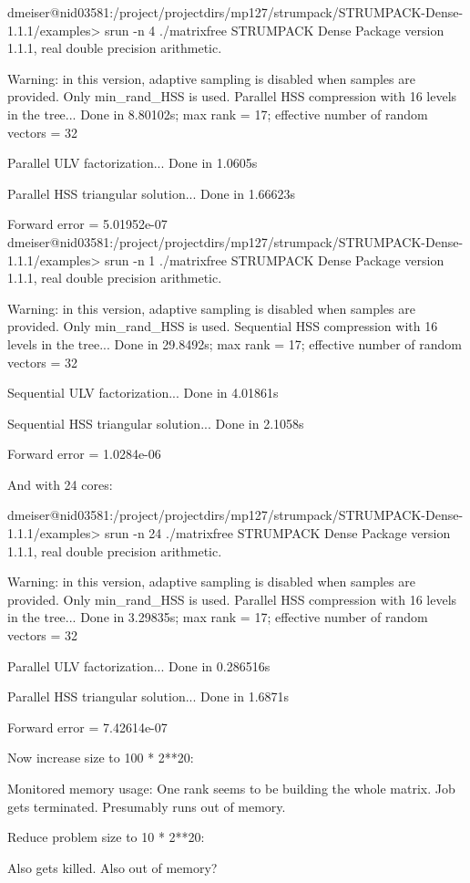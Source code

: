 \documentclass{acmsmall}
\begin{document}
dmeiser@nid03581:/project/projectdirs/mp127/strumpack/STRUMPACK-Dense-1.1.1/examples>
srun -n 4 ./matrixfree
STRUMPACK Dense Package version 1.1.1, real double precision arithmetic.

Warning: in this version, adaptive sampling is disabled when samples are
provided. Only min_rand_HSS is used.
Parallel HSS compression with 16 levels in the tree...
Done in 8.80102s; max rank = 17; effective number of random vectors = 32

Parallel ULV factorization...
Done in 1.0605s

Parallel HSS triangular solution...
Done in 1.66623s

Forward error = 5.01952e-07
dmeiser@nid03581:/project/projectdirs/mp127/strumpack/STRUMPACK-Dense-1.1.1/examples>
srun -n 1 ./matrixfree
STRUMPACK Dense Package version 1.1.1, real double precision arithmetic.

Warning: in this version, adaptive sampling is disabled when samples are
provided. Only min_rand_HSS is used.
Sequential HSS compression with 16 levels in the tree...
Done in 29.8492s; max rank = 17; effective number of random vectors = 32

Sequential ULV factorization...
Done in 4.01861s

Sequential HSS triangular solution...
Done in 2.1058s

Forward error = 1.0284e-06


And with 24 cores:


dmeiser@nid03581:/project/projectdirs/mp127/strumpack/STRUMPACK-Dense-1.1.1/examples>
srun -n 24 ./matrixfree
STRUMPACK Dense Package version 1.1.1, real double precision arithmetic.

Warning: in this version, adaptive sampling is disabled when samples are
provided. Only min_rand_HSS is used.
Parallel HSS compression with 16 levels in the tree...
Done in 3.29835s; max rank = 17; effective number of random vectors = 32

Parallel ULV factorization...
Done in 0.286516s

Parallel HSS triangular solution...
Done in 1.6871s

Forward error = 7.42614e-07


Now increase size to 100 * 2**20:


Monitored memory usage:  One rank seems to be building the whole matrix.
Job gets terminated.  Presumably runs out of memory.



Reduce problem size to 10 * 2**20:

Also gets killed.  Also out of memory?




\fi
\end{document}

